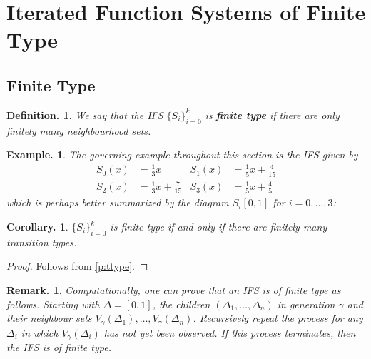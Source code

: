 \documentclass[11pt, a4paper]{memoir}
\theoremstyle{change}
\newtheorem{corollary}[theorem]{Corollary.}
\theoremstyle{plain}
\theoremstyle{nonumberplain}
\newtheorem{definition}{Definition.}
\newtheorem{example}{Example.}
\newtheorem{remark}{Remark.}
\newtheorem{proof}{Proof}
\numberwithin{equation}{section}
\begin{document}
\section{Iterated Function Systems of Finite Type}
\subsection{Finite Type}
\begin{definition}
    We say that the IFS $\{S_i\}_{i=0}^k$ is \textbf{finite type} if there are only finitely many neighbourhood sets.
\end{definition}
\begin{example}
    The governing example throughout this section is the IFS given by
    \begin{align*}
        S_0(x)&=\frac{1}{3}x & S_1(x) &= \frac{1}{5}x+\frac{4}{15}\\
        S_2(x) &= \frac{1}{3}x+\frac{7}{15} & S_3(x) &= \frac{1}{5}x+\frac{4}{5}
    \end{align*}
    which is perhaps better summarized by the diagram $S_i[0,1]$ for $i=0,\ldots,3$:
    \begin{center}
    \end{center}
\end{example}
\begin{corollary}
    $\{S_i\}_{i=0}^k$ is finite type if and only if there are finitely many transition types.
\end{corollary}
\begin{proof}
    Follows from \cref{p:ttype}.
\end{proof}
\begin{remark}
    Computationally, one can prove that an IFS is of finite type as follows.
    Starting with $\Delta=[0,1]$, the children $(\Delta_1,\ldots,\Delta_n)$ in generation $\gamma$ and their neighbour sets $V_\gamma(\Delta_1),\ldots,V_\gamma(\Delta_n)$.
    Recursively repeat the process for any $\Delta_i$ in which $V_\gamma(\Delta_i)$ has not yet been observed.
    If this process terminates, then the IFS is of finite type.
\end{remark}
\end{document}
